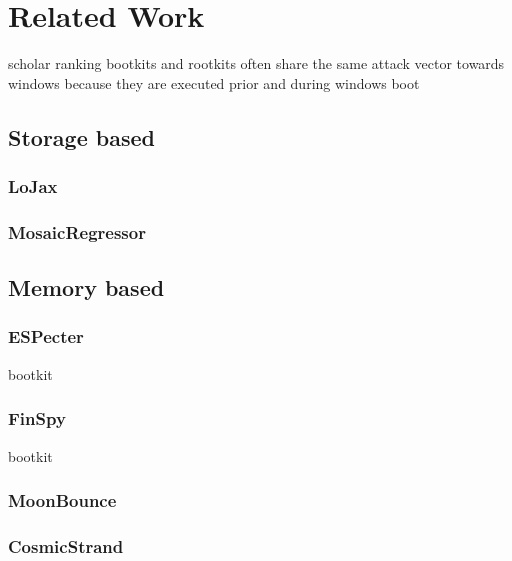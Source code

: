 
\chapter{Related Work}


scholar ranking
bootkits and rootkits often share the same attack vector towards windows because they are executed prior and during windows boot

\section{Storage based}

\subsection{LoJax}

\subsection{MosaicRegressor}

\section{Memory based}

\subsection{ESPecter}

bootkit

\subsection{FinSpy}


bootkit

\subsection{MoonBounce}

\subsection{CosmicStrand}

